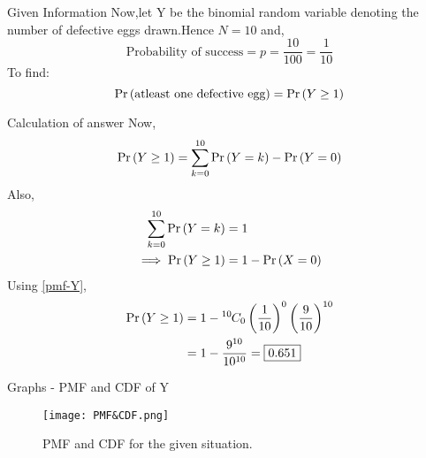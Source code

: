 \documentclass{beamer}
\begin{document}
\begin{frame}{Given Information}
   Now,let Y be the binomial random variable denoting the number of defective eggs drawn.Hence $N = 10$ and,
\begin{equation}
    \text{Probability of success} = p = \frac{10}{100} = \frac{1}{10} 
\end{equation}
To find:
\begin{equation}
    \Pr\left(\text{atleast one defective egg}\right) = \Pr\left(Y \ge 1\right) 
\end{equation}
\end{frame}
\begin{frame}{Calculation of answer}
Now,
\begin{equation}
    \Pr\left(Y \ge 1\right) = \sum_{k=0}^{10} \Pr\left(Y = k\right) - \Pr\left(Y = 0\right)
\end{equation}
Also,
\begin{align}
    \sum_{k=0}^{10} \Pr\left(Y = k\right) &= 1 \\
    \implies \Pr\left(Y \ge 1\right) &= 1 - \Pr\left(X = 0\right)
\end{align}
Using \eqref{pmf-Y},
\begin{align}
 \Pr\left(Y \ge 1\right) &= 1 - {{}^{10}\mkern-1muC_{0}}\left(\frac{1}{10}\right)^0\left(\frac{9}{10}\right)^{10}\\
            &= 1 - \frac{9^{10}}{10^{10}} = \boxed{0.651}
\end{align} 
\end{frame}

\begin{frame}{Graphs - PMF and CDF of Y}
    \begin{figure}[!ht]
\texttt{[image: PMF\&CDF.png]}
\caption{PMF and CDF for the given situation.}
\label{Fig 1}
\end{figure}
\end{frame}
\end{document}
